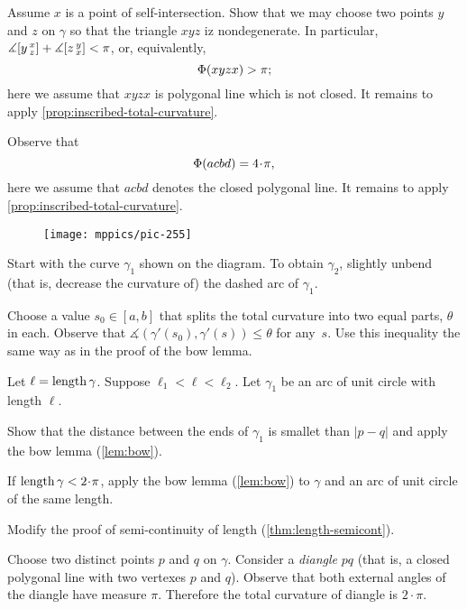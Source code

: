  Assume $x$ is a point of self-intersection.
Show that we may choose two points $y$ and $z$ on $\gamma$ so that the triangle $xyz$ iz nondegenerate.
In particular, 
$\measuredangle[y\,{}^{x}_{z}]
+
\measuredangle[z\,{}^{y}_{x}]
<\pi$, or, equivalently, 
\[\Phi({xyzx})>\pi;\]
here we assume that $xyzx$ is polygonal line which is not closed. 
It remains to apply \ref{prop:inscribed-total-curvature}.

Observe that 
\[\tc{acbd}=4\cdot\pi,\]
here we assume that $acbd$ denotes the closed polygonal line.
It remains to apply \ref{prop:inscribed-total-curvature}.

{

\begin{wrapfigure}{r}{22 mm}
\vskip-6mm
\centering
\texttt{[image: mppics/pic-255]}
\vskip0mm
\end{wrapfigure}

Start with the curve $\gamma_1$ shown on the diagram.
To obtain $\gamma_2$, slightly unbend (that is, decrease the curvature of) the dashed arc of $\gamma_1$.

}

Choose a value $s_0\in[a,b]$ that splits the total curvature into two equal parts, $\theta$ in each.
Observe that $\measuredangle(\gamma'(s_0),\gamma'(s))\le \theta$ for any~$s$.
Use this inequality the same way as in the proof of the bow lemma.

Let $\ell=\mathop{\rm length}\nolimits\gamma$.
Suppose $\ell_1<\ell<\ell_2$.
Let $\gamma_1$ be an arc of unit circle with length $\ell$.

Show that the distance between the ends of $\gamma_1$ is smallet than $|p-q|$ and apply the bow lemma (\ref{lem:bow}).


 If $\length\gamma<2\cdot\pi$, apply the bow lemma (\ref{lem:bow}) to $\gamma$ and an arc of unit circle of the same length.

 Modify the proof of semi-continuity of length (\ref{thm:length-semicont}).

Choose two distinct points $p$ and $q$ on $\gamma$.
Consider a {}\emph{diangle} $pq$ (that is, a closed polygonal line with two vertexes $p$ and $q$).
Observe that both external angles of the diangle have measure $\pi$.
Therefore the total curvature of diangle is $2\cdot \pi$.

